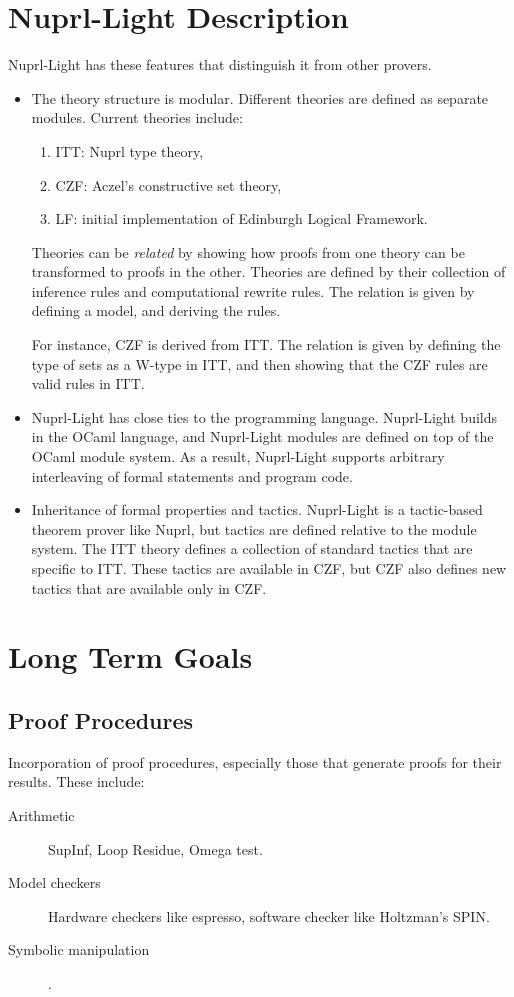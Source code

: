 \documentclass{article}
\begin{document}
\section{Nuprl-Light Description}

Nuprl-Light has these features that distinguish it from other provers.

\begin{itemize}
\item
The theory structure is modular.  Different theories are defined as
separate modules.  Current theories include:
\begin{enumerate}
\item
ITT: Nuprl type theory,
\item
CZF: Aczel's constructive set theory,
\item
LF: initial implementation of Edinburgh Logical Framework.
\end{enumerate}

Theories can be {\em related\/} by showing how proofs from one
theory can be transformed to proofs in the other.  Theories are
defined by their collection of inference rules and computational
rewrite rules.  The relation is given by defining a model, and
deriving the rules.

For instance, CZF is derived from ITT.  The relation is given by
defining the type of sets as a W-type in ITT, and then showing that
the CZF rules are valid rules in ITT.

\item
Nuprl-Light has close ties to the programming language.  Nuprl-Light
builds in the OCaml language, and Nuprl-Light modules are defined on
top of the OCaml module system.  As a result, Nuprl-Light supports
arbitrary interleaving of formal statements and program code.

\item
Inheritance of formal properties and tactics.  Nuprl-Light is a
tactic-based theorem prover like Nuprl, but tactics are defined
relative to the module system.  The ITT theory defines a collection of
standard tactics that are specific to ITT.  These tactics are
available in CZF, but CZF also defines new tactics that are available
only in CZF.
\end{itemize}

\section{Long Term Goals}

\subsection{Proof Procedures}
Incorporation of proof procedures, especially those that generate
proofs for their results.  These include:
\begin{description}
\item[Arithmetic]
SupInf, Loop Residue, Omega test.
\item[Model checkers]
Hardware checkers like espresso,
software checker like Holtzman's SPIN.
\item[Symbolic manipulation].
\end{description}
\end{document}

